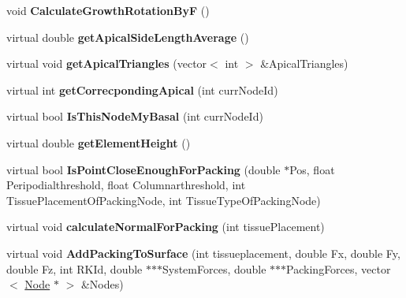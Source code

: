 \begin{DoxyCompactItemize}
\item 
\hypertarget{classShapeBase_a9ae4c5fc8817528493502e3f75c9a984}{}void {\bfseries Calculate\+Growth\+Rotation\+By\+F} ()\label{classShapeBase_a9ae4c5fc8817528493502e3f75c9a984}

\item 
\hypertarget{classShapeBase_a6d8088a8bb897d79a796a253c06d954f}{}virtual double {\bfseries get\+Apical\+Side\+Length\+Average} ()\label{classShapeBase_a6d8088a8bb897d79a796a253c06d954f}

\item 
\hypertarget{classShapeBase_a440ec12735963373a1e90922c0b57bac}{}virtual void {\bfseries get\+Apical\+Triangles} (vector$<$ int $>$ \&Apical\+Triangles)\label{classShapeBase_a440ec12735963373a1e90922c0b57bac}

\item 
\hypertarget{classShapeBase_ac210b3828c14aa394e6e2222617ddcfa}{}virtual int {\bfseries get\+Correcponding\+Apical} (int curr\+Node\+Id)\label{classShapeBase_ac210b3828c14aa394e6e2222617ddcfa}

\item 
\hypertarget{classShapeBase_abc13c22e407ba29384b0995a55f32463}{}virtual bool {\bfseries Is\+This\+Node\+My\+Basal} (int curr\+Node\+Id)\label{classShapeBase_abc13c22e407ba29384b0995a55f32463}

\item 
\hypertarget{classShapeBase_a995a5e6a553ed0cdaadf74dab4f88822}{}virtual double {\bfseries get\+Element\+Height} ()\label{classShapeBase_a995a5e6a553ed0cdaadf74dab4f88822}

\item 
\hypertarget{classShapeBase_a1c09acb3989e4d461c2ce74715214954}{}virtual bool {\bfseries Is\+Point\+Close\+Enough\+For\+Packing} (double $\ast$Pos, float Peripodialthreshold, float Columnarthreshold, int Tissue\+Placement\+Of\+Packing\+Node, int Tissue\+Type\+Of\+Packing\+Node)\label{classShapeBase_a1c09acb3989e4d461c2ce74715214954}

\item 
\hypertarget{classShapeBase_ab6611ef2738450d5990e93ccedcb18ad}{}virtual void {\bfseries calculate\+Normal\+For\+Packing} (int tissue\+Placement)\label{classShapeBase_ab6611ef2738450d5990e93ccedcb18ad}

\item 
\hypertarget{classShapeBase_ac754abfd56aff0bb0b6bb1ca0f1c6b7c}{}virtual void {\bfseries Add\+Packing\+To\+Surface} (int tissueplacement, double Fx, double Fy, double Fz, int R\+K\+Id, double $\ast$$\ast$$\ast$System\+Forces, double $\ast$$\ast$$\ast$Packing\+Forces, vector$<$ \hyperlink{classNode}{Node} $\ast$ $>$ \&Nodes)\label{classShapeBase_ac754abfd56aff0bb0b6bb1ca0f1c6b7c}


\end{DoxyCompactItemize}
